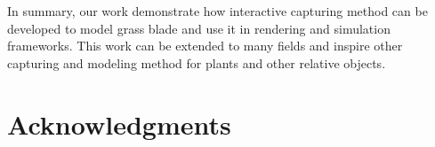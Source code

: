 \documentclass[10pt,journal,compsoc]{IEEEtran}
\begin{document}
In summary, our work demonstrate how interactive capturing method can be developed to model grass blade and use it in rendering and simulation frameworks. This work can be extended to many fields and inspire other capturing and modeling method for plants and other relative objects.




%


%


\ifCLASSOPTIONcompsoc
  \section*{Acknowledgments}
\else
\end{document}
